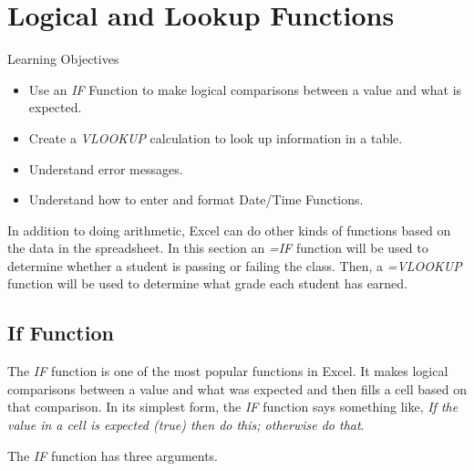 \section{Logical and Lookup Functions}

\begin{center}
	\begin{objbox}{Learning Objectives}
		\begin{itemize}
			\setlength{\itemsep}{0pt}
			\setlength{\parskip}{0pt}
			\setlength{\parsep}{0pt}

			\item Use an \textit{IF} Function to make logical comparisons between a value and what is expected.
			\item Create a \textit{VLOOKUP} calculation to look up information in a table.
			\item Understand error messages.
			\item Understand how to enter and format Date/Time Functions.
			
		\end{itemize}
	\end{objbox}
\end{center}

In addition to doing arithmetic, Excel can do other kinds of functions based on the data in the spreadsheet. In this section an \textit{=IF} function will be used to determine whether a student is passing or failing the class. Then, a \textit{=VLOOKUP} function will be used to determine what grade each student has earned.

\subsection{If Function}

The \textit{IF} function is one of the most popular functions in Excel. It makes logical comparisons between a value and what was expected and then fills a cell based on that comparison. In its simplest form, the \textit{IF} function says something like, \textit{If the value in a cell is expected (true) then do this; otherwise do that}.

The \textit{IF} function has three arguments.


